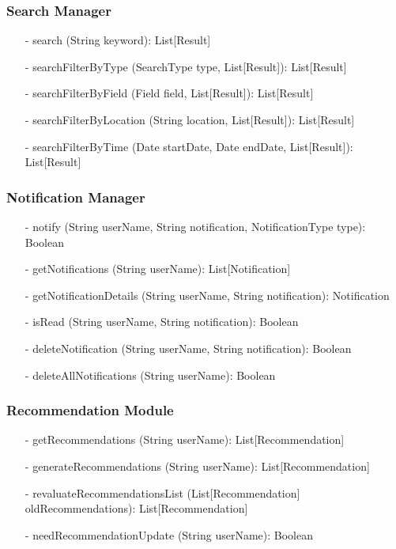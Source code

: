 \subsubsection{Search Manager}
\begin{itemize}
    \item[-] search (String keyword): List[Result]
    \item[-] searchFilterByType (SearchType type, List[Result]): List[Result]
    \item[-] searchFilterByField (Field field, List[Result]): List[Result]
    \item[-] searchFilterByLocation (String location, List[Result]): List[Result]
    \item[-] searchFilterByTime (Date startDate, Date endDate, List[Result]): List[Result]
\end{itemize}


\subsubsection{Notification Manager}
\begin{itemize}
    \item[-] notify (String userName, String notification, NotificationType type): Boolean
    \item[-] getNotifications (String userName): List[Notification]
    \item[-] getNotificationDetails (String userName, String notification): Notification
    \item[-] isRead (String userName, String notification): Boolean
    \item[-] deleteNotification (String userName, String notification): Boolean
    \item[-] deleteAllNotifications (String userName): Boolean
\end{itemize}


\subsubsection{Recommendation Module}
\begin{itemize}
    \item[-] getRecommendations (String userName): List[Recommendation]
    \item[-] generateRecommendations (String userName): List[Recommendation]
    \item[-] revaluateRecommendationsList (List[Recommendation] oldRecommendations): List[Recommendation]
    \item[-] needRecommendationUpdate (String userName): Boolean
\end{itemize}



